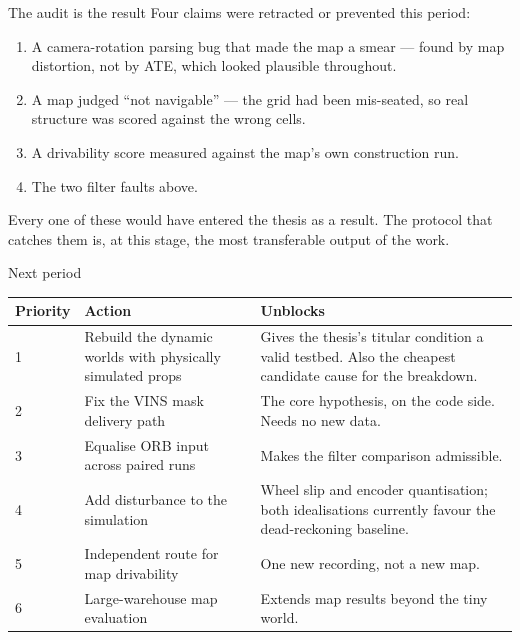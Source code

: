 \documentclass[aspectratio=169,11pt]{beamer}
\begin{document}
\begin{frame}{The audit is the result}
  Four claims were retracted or prevented this period:

  \vspace{0.8em}
  \begin{enumerate}
    \item A camera-rotation parsing bug that made the map a smear --- found by
      map distortion, not by ATE, which looked plausible throughout.
    \item A map judged ``not navigable'' --- the grid had been mis-seated, so
      real structure was scored against the wrong cells.
    \item A drivability score measured against the map's own construction run.
    \item The two filter faults above.
  \end{enumerate}

  \vspace{0.8em}
  \begin{block}{}
    Every one of these would have entered the thesis as a result. The protocol
    that catches them is, at this stage, the most transferable output of the
    work.
  \end{block}
\end{frame}

\begin{frame}{Next period}
  \small
  \begin{tabular}{llp{5.2cm}}
    \toprule
    Priority & Action & Unblocks \\
    \midrule
    1 & Rebuild the dynamic worlds with physically simulated props & Gives the
      thesis's titular condition a valid testbed. Also the cheapest candidate
      cause for the breakdown. \\
    2 & Fix the VINS mask delivery path & The core hypothesis, on the code side.
      Needs no new data. \\
    3 & Equalise ORB input across paired runs & Makes the filter comparison
      admissible. \\
    4 & Add disturbance to the simulation & Wheel slip and encoder quantisation;
      both idealisations currently favour the dead-reckoning baseline. \\
    5 & Independent route for map drivability & One new recording, not a new
      map. \\
    6 & Large-warehouse map evaluation & Extends map results beyond the tiny
      world. \\
    \bottomrule
  \end{tabular}
\end{frame}
\end{document}
